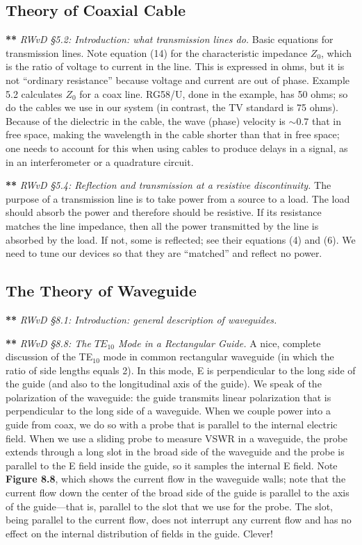 \documentclass[12pt,preprint]{aastex}
\begin{document}
\subsection{ Theory of Coaxial Cable}
	
{\bf ***} {\it RWvD \S 5.2:  Introduction: what transmission lines do.}
Basic equations for transmission lines.  Note
equation (14) for the characteristic impedance $Z_0$, which is the ratio
of voltage to current in the line.  This is expressed in ohms, but it is
not ``ordinary resistance'' because voltage and current are out of
phase.  Example 5.2 calculates $Z_0$ for a coax line.  RG58/U, done in
the example, has 50 ohms; so do the cables we use in our system (in
contrast, the TV standard is 75 ohms).  Because of the dielectric in the
cable, the wave (phase) velocity is $\sim 0.7$ that in free space,
making the wavelength in the cable shorter than that in free space; one
needs to account for this when using cables to produce delays in a
signal, as in an interferometer or a quadrature circuit. 

{\bf ***} {\it RWvD \S 5.4: Reflection and transmission at a resistive
discontinuity.} The purpose of a transmission line is to take power from
a source to a load. The load should absorb the power and therefore
should be resistive. If its resistance matches the line impedance, then
all the power transmitted by the line is absorbed by the load. If not,
some is reflected; see their equations (4) and (6). We need to tune our
devices so that they are ``matched'' and reflect no power. 

\subsection{The Theory of Waveguide}
          
{\bf ***} {\it RWvD \S 8.1:  Introduction: general description of
waveguides.} 

{\bf ***} {\it RWvD \S 8.8:  The $TE_{10}$ Mode in a Rectangular
Guide.} A nice, complete discussion of the TE$_{10}$ mode in common
rectangular waveguide (in which the ratio of side lengths equals 2). 
In this mode, E is perpendicular to the long side of the guide
(and also to the longitudinal axis of the guide).  We speak of the
polarization of the waveguide: the guide transmits linear polarization
that is perpendicular to the long side of a waveguide.  When we couple
power into a guide from coax, we do so with a probe that is parallel to
the internal electric field.  When we use a sliding probe to measure
VSWR in a waveguide, the probe extends through a long slot in the broad
side of the waveguide and the probe is parallel to the E field inside
the guide, so it samples the internal E field.  Note {\bf Figure 8.8},
which shows the current flow in the waveguide walls; note that the
current flow down the center of the broad side of the guide is parallel
to the axis of the guide---that is, parallel to the slot that we use for
the probe.  The slot, being parallel to the current flow, does not
interrupt any current flow and has no effect on the internal
distribution of fields in the guide.  Clever!
\end{document}
